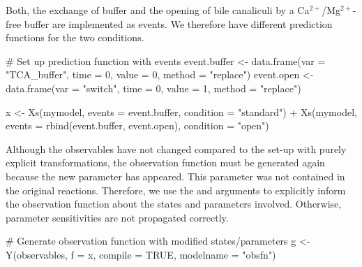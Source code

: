 \documentclass[article]{jss}
\begin{document}
\begin{CodeChunk}
\end{CodeChunk}

Both, the exchange of buffer and the opening of bile canaliculi by a Ca$^{2+}$/Mg$^{2+}$-free buffer are implemented as events. We therefore have different prediction functions for the two conditions.

\begin{CodeChunk}
\begin{CodeInput}
# Set up prediction function with events
event.buffer <- data.frame(var = "TCA_buffer",
			   time = 0,
			   value = 0,
			   method = "replace")
event.open   <- data.frame(var = "switch",
			   time = 0,
			   value = 1,
			   method = "replace")

x <- Xs(mymodel,
	events = event.buffer,
	condition = "standard") +
     Xs(mymodel,
        events = rbind(event.buffer, event.open),
	condition = "open")
\end{CodeInput}
\end{CodeChunk}

Although the observables have not changed compared to the set-up with purely explicit transformations, the observation function must be generated again because the new parameter  has appeared. This parameter was not contained in the original reactions. Therefore, we use the  and  arguments to explicitly inform the observation function about the states and parameters involved. Otherwise, parameter sensitivities are not propagated correctly.

\begin{CodeChunk}
\begin{CodeInput}
# Generate observation function with modified states/parameters
g <- Y(observables, f = x,
       compile = TRUE, modelname = "obsfn")
\end{CodeInput}
\end{CodeChunk}
\end{document}
